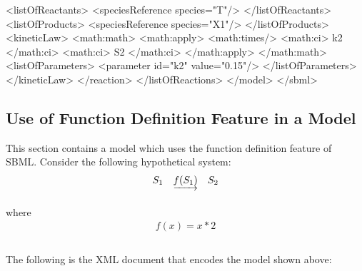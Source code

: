 \documentclass[10pt,twocolumntoc]{cekarticle}
\begin{document}
\begin{example}
                <listOfReactants>
                    <speciesReference species="T"/>
                </listOfReactants>
                <listOfProducts>
                    <speciesReference species="X1"/>
                </listOfProducts>
                <kineticLaw>
                    <math:math>
                        <math:apply>
                            <math:times/>
                            <math:ci> k2 </math:ci>
                            <math:ci> S2 </math:ci>
                        </math:apply>
                    </math:math>
                    <listOfParameters>
                        <parameter id="k2" value="0.15"/>
                    </listOfParameters>
                </kineticLaw>
            </reaction>
        </listOfReactions>
    </model>
</sbml>
\end{example}

\subsection{Use of Function Definition Feature in a Model}
\label{sec:functioneg}

This section contains a model which uses the function definition
feature of SBML.  Consider the following hypothetical system:
\begin{equation*}
  \begin{array}{@{}ccc@{}}
    S_1 & \underrightarrow{f(S_1)} & S_2 \\ \\[-4pt]
  \end{array}
\end{equation*}
where
\begin{equation*}
  \begin{array}{l}
    f(x) = x * 2 \\ \\[-4pt]
  \end{array}
\end{equation*}

The following is the XML document that encodes the model shown
above:
\end{document}
